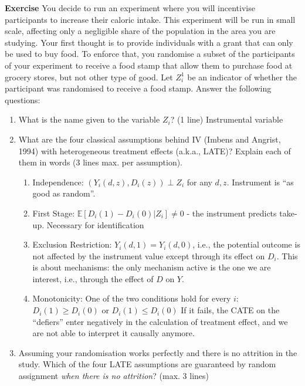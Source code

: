 \documentclass[10pt]{article}
\newcounter{exercise}
\newenvironment{exercise}%
{%
	\refstepcounter{exercise}%
	\textbf{Exercise \theexercise}%
	}%
{
 \par\vspace{\baselineskip}%
\noindent\ignorespacesafterend
}
\begin{document}
\begin{exercise}\label{indep}
	You decide to run an experiment where you will incentivise participants to increase their caloric intake. This experiment will be run in small scale, affecting only a negligible share of the population in the area you are studying.
	Your first thought is to provide individuals with a grant that can only be used to buy food. To enforce that, you randomise a subset of the participants of your experiment to receive a food stamp that allow them to purchase food at grocery stores, but not other type of good. Let $ Z^{1}_{i} $ be an indicator of whether the participant was randomised to receive a food stamp. Answer the following questions:
	\begin{enumerate}
		\item What is the name given to the variable $ Z_{i} $? (1 line)
	\color{red}
		Instrumental variable
	\color{black}
		
		\item What are the four classical assumptions behind IV (Imbens and Angrist, 1994) with heterogeneous treatment effects (a.k.a., LATE)? Explain each of them in words (3 lines max. per assumption).
		
			\color{red}
		
		\begin{enumerate}
			\item Independence: $ (Y_i(d,z), D_i(z))  \perp  Z_i $ for any $ d, z $. Instrument is ``as good as random''.
			\item First Stage: $\mathbb{E} \left[ D_i(1) - D_i(0) | Z_i \right] \neq 0 $ - the instrument predicts take-up. Necessary for identification
			\item Exclusion Restriction: $ Y_i(d,1) = Y_i(d,0) $, i.e., the potential outcome is not affected by the instrument value except through its effect on $ D_i $. This is about mechanisms: the only mechanism active is the one we are interest, i.e., through the effect of $ D $ on $ Y $.
			\item Monotonicity: One of the two conditions hold for every $ i $: $ D_i(1) \geq  D_i(0) $ or  $ D_i(1) \leq  D_i(0) $ If it fails, the CATE on the ``defiers'' enter negatively in the calculation of treatment effect, and we are not able to interpret it causally anymore.
		\end{enumerate}
		
		\color{black}
		
		\item Assuming your randomisation works perfectly and there is no attrition in the study. Which of the four LATE assumptions are guaranteed by random assignment \textit{when there is no attrition}? (max. 3 lines)
		

\end{enumerate}
\end{exercise}
\end{document}
